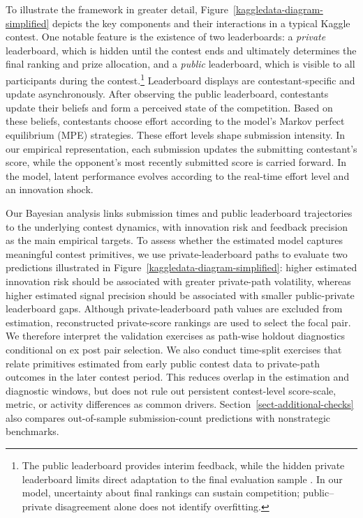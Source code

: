 \documentclass[mnsc]{informs3}
\begin{document}
To illustrate the framework in greater detail, Figure~\ref{kaggledata-diagram-simplified} depicts the key components and their interactions in a typical Kaggle contest.
One notable feature is the existence of two leaderboards: a \textit{private} leaderboard, which is hidden until the contest ends and ultimately determines the final ranking and prize allocation, and a \textit{public} leaderboard, which is visible to all participants during the contest.\footnote{
The public leaderboard provides interim feedback, while the hidden private leaderboard limits direct adaptation to the final evaluation sample \citep[see also][]{blum2015ladder}. In our model, uncertainty about final rankings can sustain competition; public--private disagreement alone does not identify overfitting.
}
Leaderboard displays are contestant-specific and update asynchronously.
After observing the public leaderboard, contestants update their beliefs and form a perceived state of the competition.
Based on these beliefs, contestants choose effort according to the model’s Markov perfect equilibrium (MPE) strategies.
These effort levels shape submission intensity.
In our empirical representation, each submission updates the submitting contestant's score, while the opponent's most recently submitted score is carried forward.
In the model, latent performance evolves according to the real-time effort level and an innovation shock.


Our Bayesian analysis links submission times and public leaderboard trajectories to the underlying contest dynamics, with innovation risk and feedback precision as the main empirical targets.
To assess whether the estimated model captures meaningful contest primitives, we use private-leaderboard paths to evaluate two predictions illustrated in Figure~\ref{kaggledata-diagram-simplified}:
higher estimated innovation risk should be associated with greater private-path volatility,
whereas higher estimated signal precision should be associated with smaller public-private leaderboard gaps.
Although private-leaderboard path values are excluded from estimation, reconstructed private-score rankings are used to select the focal pair. We therefore interpret the validation exercises as path-wise holdout diagnostics conditional on ex post pair selection.
We also conduct time-split exercises that relate primitives estimated from early public contest data to private-path outcomes in the later contest period. This reduces overlap in the estimation and diagnostic windows, but does not rule out persistent contest-level score-scale, metric, or activity differences as common drivers. Section~\ref{sect-additional-checks} also compares out-of-sample submission-count predictions with nonstrategic benchmarks.
\end{document}
